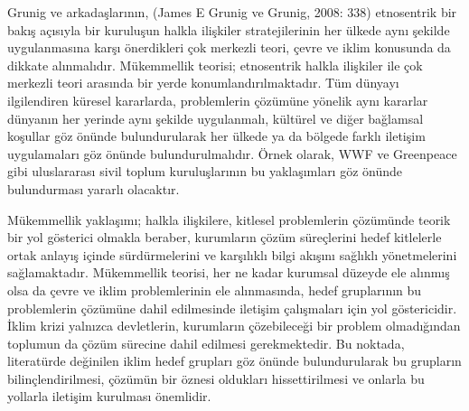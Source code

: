 \documentclass[
]{book}
\begin{document}
Grunig ve arkadaşlarının, (James E Grunig ve Grunig, 2008: 338) etnosentrik bir bakış açısıyla bir kuruluşun halkla ilişkiler stratejilerinin her ülkede aynı şekilde uygulanmasına karşı önerdikleri çok merkezli teori, çevre ve iklim konusunda da dikkate alınmalıdır. Mükemmellik teorisi; etnosentrik halkla ilişkiler ile çok merkezli teori arasında bir yerde konumlandırılmaktadır. Tüm dünyayı ilgilendiren küresel kararlarda, problemlerin çözümüne yönelik aynı kararlar dünyanın her yerinde aynı şekilde uygulanmalı, kültürel ve diğer bağlamsal koşullar göz önünde bulundurularak her ülkede ya da bölgede farklı iletişim uygulamaları göz önünde bulundurulmalıdır. Örnek olarak, WWF ve Greenpeace gibi uluslararası sivil toplum kuruluşlarının bu yaklaşımları göz önünde bulundurması yararlı olacaktır.

Mükemmellik yaklaşımı; halkla ilişkilere, kitlesel problemlerin çözümünde teorik bir yol gösterici olmakla beraber, kurumların çözüm süreçlerini hedef kitlelerle ortak anlayış içinde sürdürmelerini ve karşılıklı bilgi akışını sağlıklı yönetmelerini sağlamaktadır. Mükemmellik teorisi, her ne kadar kurumsal düzeyde ele alınmış olsa da çevre ve iklim problemlerinin ele alınmasında, hedef gruplarının bu problemlerin çözümüne dahil edilmesinde iletişim çalışmaları için yol göstericidir. İklim krizi yalnızca devletlerin, kurumların çözebileceği bir problem olmadığından toplumun da çözüm sürecine dahil edilmesi gerekmektedir. Bu noktada, literatürde değinilen iklim hedef grupları göz önünde bulundurularak bu grupların bilinçlendirilmesi, çözümün bir öznesi oldukları hissettirilmesi ve onlarla bu yollarla iletişim kurulması önemlidir.
\end{document}
